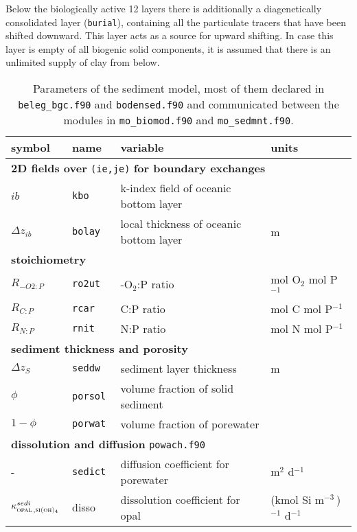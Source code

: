 \documentclass[11pt,a4paper,fleqn,twoside]{article}
\def\sio{\text{\textsc{si(oh)$_4$}}\,}
\def\opal{\text{\textsc{opal}}\,}
\newcommand{\concSi}{kmol Si m$^{-3}$\,}
\begin{document}
Below the biologically active 12 layers there is additionally a diagenetically
consolidated layer ({\tt burial}), containing all the particulate tracers that
have been shifted downward. This layer acts as a source for upward shifting. In
case this layer is empty of all biogenic solid components, it is assumed that
there is an unlimited supply of clay from below. 

\begin{table}[htb]
{\caption{\label{tab_sedi_params}  Parameters of the sediment model, most of 
them declared in {\tt beleg\_bgc.f90} and {\tt bodensed.f90} and communicated 
between the modules in {\tt mo\_biomod.f90} and {\tt mo\_sedmnt.f90}.}}
\vspace{.2cm}
\renewcommand{\baselinestretch}{1}
\footnotesize
\begin{center}
\begin{tabular}{llp{5cm}l} \hline 
symbol & name & variable & units \\ \hline
\multicolumn{4}{l}{\rule{0mm}{4mm}{\bf 2D fields over }{\tt (ie,je)} {\bf for boundary
exchanges}}\\ \hline
$ib$ &{\tt kbo}& k-index field of oceanic bottom layer & \\
$\Delta z_{ib}$ &{\tt bolay}&  local thickness of oceanic bottom layer & m\\
\multicolumn{4}{l}{\rule{0mm}{4mm}\bf stoichiometry}\\ \hline
$R_{-O2:P}$ &{\tt ro2ut}& -O$_2$:P  ratio & mol O$_2$ mol P$^{-1}$\\
$R_{C:P}$&{\tt rcar}& C:P  ratio &mol C mol P$^{-1}$\\
$R_{N:P}$&{\tt rnit}& N:P  ratio &mol N mol P$^{-1}$\\ \hline
\multicolumn{4}{l}{\rule{0mm}{4mm}{\bf sediment thickness and porosity}}\\
 \hline
$\Delta z_S$&{\tt seddw}& sediment layer thickness & m\\
$\phi$ & {\tt porsol} & volume fraction of solid sediment &  \\ 
$1-\phi$  & {\tt porwat} & volume fraction of porewater &  \\ 
\multicolumn{4}{l}{\rule{0mm}{4mm}{\bf dissolution and diffusion} {\tt powach.f90}}\\
 \hline
- & {\tt sedict } & diffusion coefficient for porewater & m$^2$ d$^{-1}$\\
$\kappa^{sedi}_{\opal,\sio}$& disso &dissolution coefficient for opal&(\concSi)$^{-1}$ d$^{-1}$\\

\end{tabular}
\end{center}
\end{table}
\end{document}
